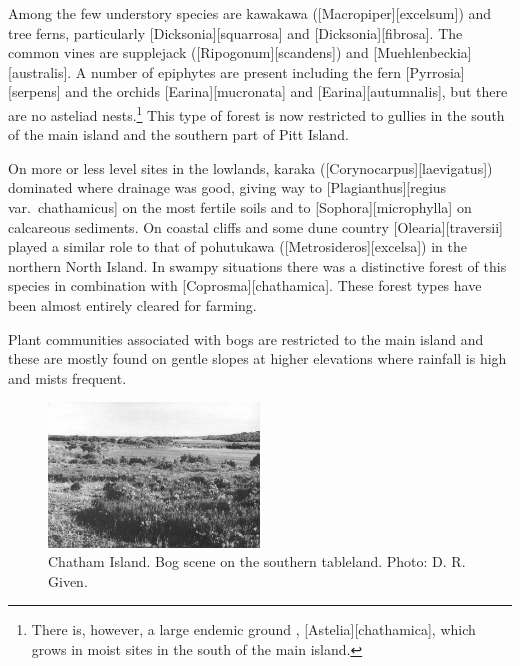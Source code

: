 Among the few understory species are kawakawa ([Macropiper][excelsum]) and tree ferns, particularly [Dicksonia][squarrosa] and [Dicksonia][fibrosa].
The common vines are supplejack ([Ripogonum][scandens]) and [Muehlenbeckia][australis].
A number of epiphytes are present including the fern [Pyrrosia][serpens] and the orchids [Earina][mucronata] and [Earina][autumnalis], but there are no asteliad nests.\footnote{There is, however, a large endemic ground , [Astelia][chathamica], which grows in moist sites in the south of the main island.}
This type of forest is now restricted to gullies in the south of the main island and the southern part of Pitt Island.

On more or less level sites in the lowlands, karaka ([Corynocarpus][laevigatus]) dominated where drainage was good, giving way to [Plagianthus][regius var.\ chathamicus] on the most fertile soils and to [Sophora][microphylla] on calcareous sediments.
On coastal cliffs and some dune country [Olearia][traversii] played a similar role to that of pohutukawa ([Metrosideros][excelsa]) in the northern North Island.
In swampy situations there was a distinctive forest of this species in combination with [Coprosma][chathamica].
These forest types have been almost entirely cleared for farming.

Plant communities associated with bogs are restricted to the main island and these are mostly found on gentle slopes at higher elevations where rainfall is high and mists frequent.

\begin{figure}
	\includegraphics[width=0.5\textwidth]{graphics/figure119chatham-island-bog.jpg}
	\centering
	\caption[Chatham Island bog scene]{Chatham Island.
	Bog scene on the southern tableland.
	Photo: D. R. Given.}%
	\label{fig:119chatham-island-bog}
\end{figure}

